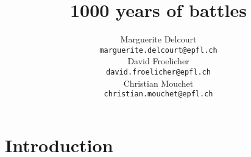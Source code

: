 \documentclass[11pt]{article}
\title{1000 years of battles}
\author{Marguerite Delcourt \\
  {\tt marguerite.delcourt@epfl.ch} \\\And
  David Froelicher \\
  {\tt david.froelicher@epfl.ch} \\\And
Christian Mouchet \\
{\tt christian.mouchet@epfl.ch} \\}
\date{}
\begin{document}
\maketitle
\begin{abstract}

\end{abstract}


\section{Introduction}

\end{document}
